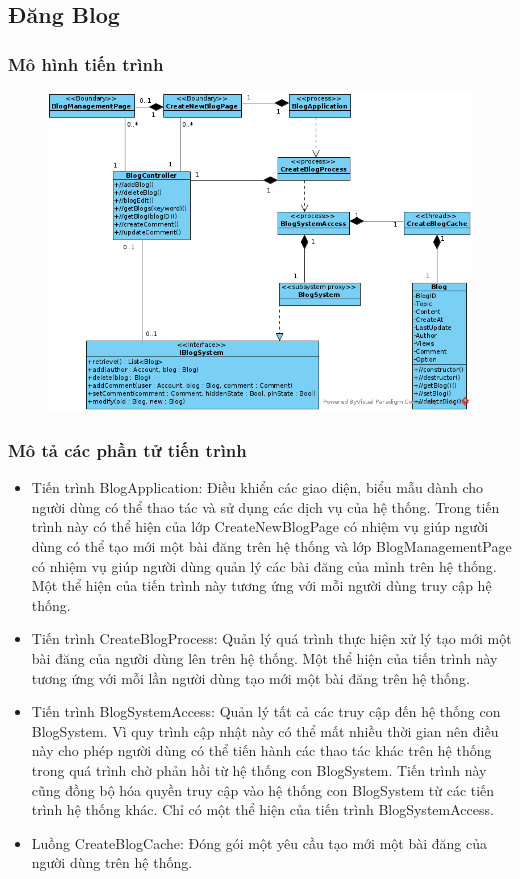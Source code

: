 \documentclass[./../main.tex]{subfiles}
\begin{document}
\subsection{Đăng Blog}

\subsubsection{Mô hình tiến trình}

\begin{figure}[H]
	\centering
	\includegraphics[width=\linewidth]{./images/pv_Blog.png}
\end{figure}

\subsubsection{Mô tả các phần tử tiến trình}
\begin{itemize}
	\item Tiến trình BlogApplication: Điều khiển các giao diện, biểu mẫu dành cho người dùng có thể thao tác và sử dụng các dịch vụ của hệ thống. Trong tiến trình này có thể hiện của lớp CreateNewBlogPage có nhiệm vụ giúp người dùng có thể tạo mới một bài đăng trên hệ thống và lớp BlogManagementPage có nhiệm vụ giúp người dùng quản lý các bài đăng của mình trên hệ thống.
	      Một thể hiện của tiến trình này tương ứng với mỗi người dùng truy cập hệ thống.
	\item Tiến trình CreateBlogProcess: Quản lý quá trình thực hiện xử lý tạo mới một bài đăng của người dùng lên trên hệ thống.
	      Một thể hiện của tiến trình này tương ứng với mỗi lần người dùng tạo mới một bài đăng trên hệ thống.
	\item Tiến trình BlogSystemAccess: Quản lý tất cả các truy cập đến hệ thống con BlogSystem. Vì quy trình cập nhật này có thể mất nhiều thời gian nên điều này cho phép người dùng có thể tiến hành các thao tác khác trên hệ thống trong quá trình chờ phản hồi từ hệ thống con BlogSystem. Tiến trình này cũng đồng bộ hóa quyền truy cập vào hệ thống con BlogSystem từ các tiến trình hệ thống khác.
	      Chỉ có một thể hiện của tiến trình BlogSystemAccess.
	\item Luồng CreateBlogCache: Đóng gói một yêu cầu tạo mới một bài đăng của người dùng trên hệ thống.
\end{itemize}
\end{document}
